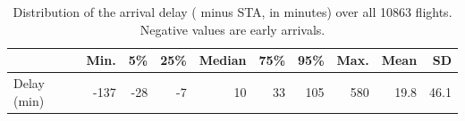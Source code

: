 \begin{table}[ht]
  \centering
  \caption{Distribution of the arrival delay (\blockon{} minus STA, in minutes) over all \num{10863} flights. Negative values are early arrivals.}
  \label{tab:delay}
  \begin{tabular}{@{}lrrrrrrrrr@{}}
    \toprule
    & Min. & 5\% & 25\% & Median & 75\% & 95\% & Max. & Mean & SD \\
    \midrule
    Delay (min) & -137 & -28 & -7 & 10 & 33 & 105 & 580 & 19.8 & 46.1 \\
    \bottomrule
  \end{tabular}
\end{table}
